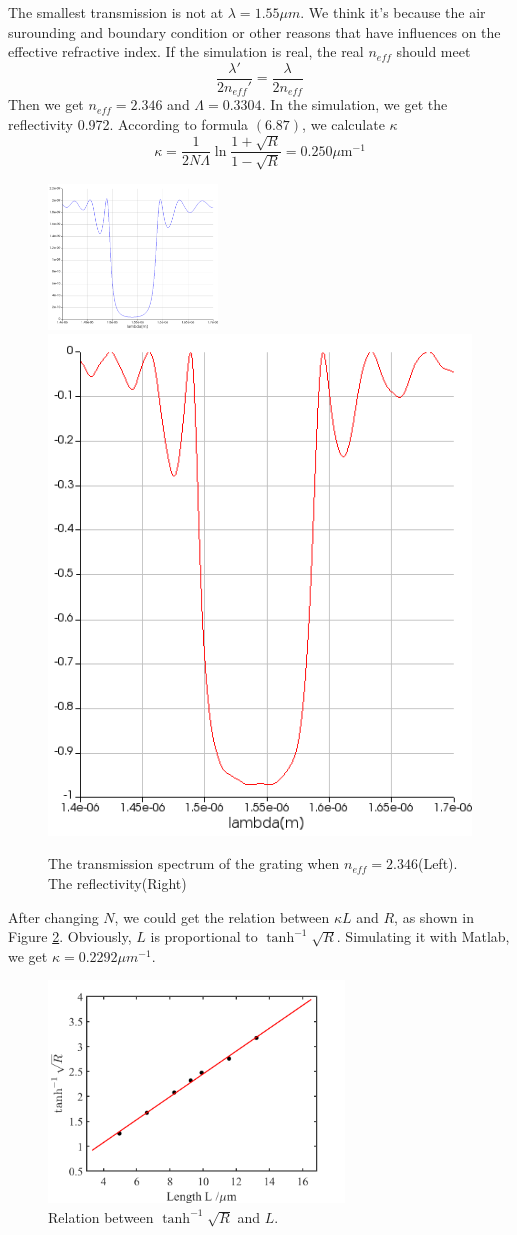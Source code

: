 \documentclass[fontsize=11pt]{scrartcl}
\begin{document}
The smallest transmission is not at $\lambda=1.55\mu m$. We think it's because the air surounding and boundary condition or other
reasons that have influences on the effective refractive index. If the simulation is real,
the real $n_{eff}$ should meet \\
\begin{equation}
    \frac{\lambda '}{2n_{eff }'}=\frac{\lambda }{2n_{eff}}
\end{equation}
Then we get $n_{eff}=2.346$ and $\Lambda=0.3304$. In the simulation, we get the reflectivity 0.972.
According to formula $(6.87)$, we calculate $\kappa$
\begin{equation}
    \kappa=\frac 1{2N\Lambda}\ln{\frac{1+\sqrt R}{1-\sqrt R}}=0.250  {\mu \mathrm{m}}^{-1}
\end{equation}
\begin{figure}[H]
    \centering
    \includegraphics[width=0.4\textwidth]{img/n2.3._Tpng.png}
    \hspace{10mm}
    \includegraphics[height=0.35\textwidth]{img/R.png}
    \caption{The transmission spectrum of the grating when $n_{eff}=2.346$(Left). The reflectivity(Right) }
    \label{n2.4_porpa}
\end{figure}
After changing $N$, we could get the relation between $\kappa L$ and $R$, as shown in Figure \ref{Rk}.
Obviously, $L$ is proportional to $\tanh^{-1}{\sqrt R}$. Simulating it with Matlab, we get $\kappa=0.2292\mu m^{-1}$.
\begin{figure}[H]
    \centering
    \includegraphics[width=0.7\textwidth]{img/kappa.png}
    \caption{Relation between $\tanh^{-1}{\sqrt R}$ and $L$. }
    \label{Rk}
\end{figure}
\end{document}
